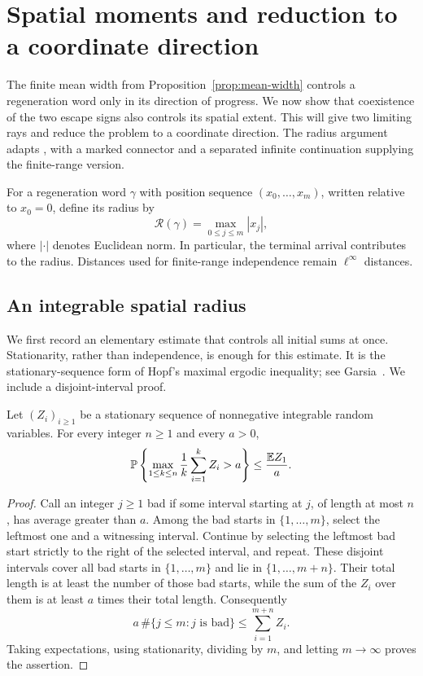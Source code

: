 \section{Spatial moments and reduction to a coordinate direction}
\label{sec:radius}

The finite mean width from Proposition~\ref{prop:mean-width} controls a
regeneration word only in its direction of progress.  We now show that
coexistence of the two escape signs also controls its spatial extent.
This will give two limiting rays and reduce the problem to a coordinate
direction.  The radius argument adapts
\cite[Proposition~3.1]{OpenAI2026}, with a marked connector and a
separated infinite continuation supplying the finite-range version.

For a regeneration word $\gamma$ with position sequence
$(x_0,\ldots,x_m)$, written relative to $x_0=0$, define its radius by
\[
  \mathcal R(\gamma)=\max_{0\le j\le m}|x_j|,
\]
where $|\cdot|$ denotes Euclidean norm.  In particular, the terminal
arrival contributes to the radius.  Distances used for finite-range
independence remain $\ell^\infty$ distances.

\subsection{An integrable spatial radius}

We first record an elementary estimate that controls all initial sums at
once.  Stationarity, rather than independence, is enough for this estimate.
It is the stationary-sequence form of Hopf's maximal ergodic inequality;
see Garsia~\cite{Garsia1965}.  We include a disjoint-interval proof.

\begin{lemma}
\label{lem:stationary-maximal}
Let $(Z_i)_{i\ge1}$ be a stationary sequence of nonnegative integrable
random variables.  For every integer $n\ge1$ and every $a>0$,
\[
  \mathbb P\left\{\max_{1\le k\le n}\frac1k\sum_{i=1}^k Z_i>a\right\}
  \le \frac{\mathbb E Z_1}{a}.
\]
\end{lemma}

\begin{proof}
Call an integer $j\ge1$ bad if some interval starting at $j$, of length
at most $n$, has average greater than $a$.  Among the bad starts in
$\{1,\ldots,m\}$, select the leftmost one and a witnessing interval.
Continue by selecting the leftmost bad start strictly to the right of
the selected interval, and repeat.  These disjoint intervals cover all
bad starts in $\{1,\ldots,m\}$ and lie in $\{1,\ldots,m+n\}$.
Their total length is at least the number of those bad starts, while
the sum of the $Z_i$ over them is at least $a$ times their total length.
Consequently
\[
  a\,\#\{j\le m:j\text{ is bad}\}\le\sum_{i=1}^{m+n}Z_i.
\]
Taking expectations, using stationarity, dividing by $m$, and letting
$m\to\infty$ proves the assertion.
\end{proof}


